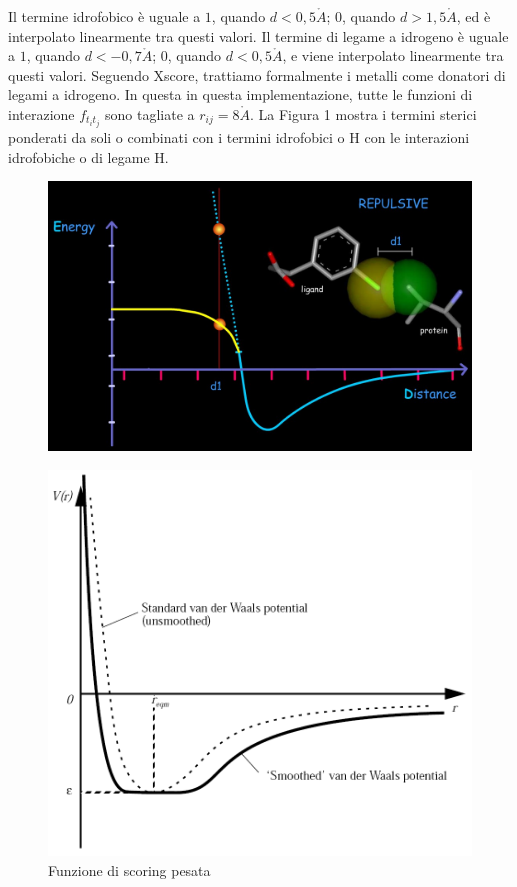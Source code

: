 Il termine idrofobico è uguale a $1$, quando $d < 0,5\mathring{A}$; $0$, quando $d > 1,5\mathring{A}$, ed è interpolato linearmente tra questi valori. Il termine di legame a idrogeno è uguale a $1$, quando $d < -0,7\mathring{A}$; $0$, quando $d < 0,5\mathring{A}$, e viene interpolato linearmente tra questi valori. Seguendo Xscore, trattiamo formalmente i metalli come donatori di legami a idrogeno. In questa in questa implementazione, tutte le funzioni di interazione $ f_{t_it_j}$ sono tagliate a $r_{ij} = 8\mathring{A}$.\newline
La Figura 1 mostra i termini sterici ponderati da soli o combinati con i termini idrofobici o H
con le interazioni idrofobiche o di legame H\cite{trott2010autodock}.

\begin{figure}[H]
    \centering
    \includegraphics[scale=0.35]{immagini/capitolo2/funzioneScoringPesata1.png}
    \label{fig:funzione di scoring pesata1}
\end{figure}

\begin{figure}[H]
    \centering
    \includegraphics[scale=0.35]{immagini/capitolo2/funzioneScoringPesata2.png}
    \caption{Funzione di scoring pesata}
    \label{fig:funzione di scoring pesata2}
\end{figure}
